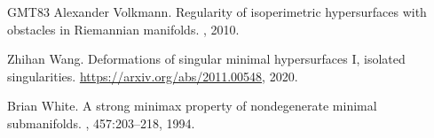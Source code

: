 \documentclass[12pt]{article}
\begin{document}
\begin{thebibliography}{GMT83}
Alexander Volkmann.
\newblock Regularity of isoperimetric hypersurfaces with obstacles in
  {R}iemannian manifolds.
, 2010.

Zhihan Wang.
\newblock Deformations of singular minimal hypersurfaces {I}, isolated
  singularities.
\newblock \url{https://arxiv.org/abs/2011.00548}, 2020.

Brian White.
\newblock A strong minimax property of nondegenerate minimal submanifolds.
, 457:203--218,
  1994.

\end{thebibliography}
\end{document}
